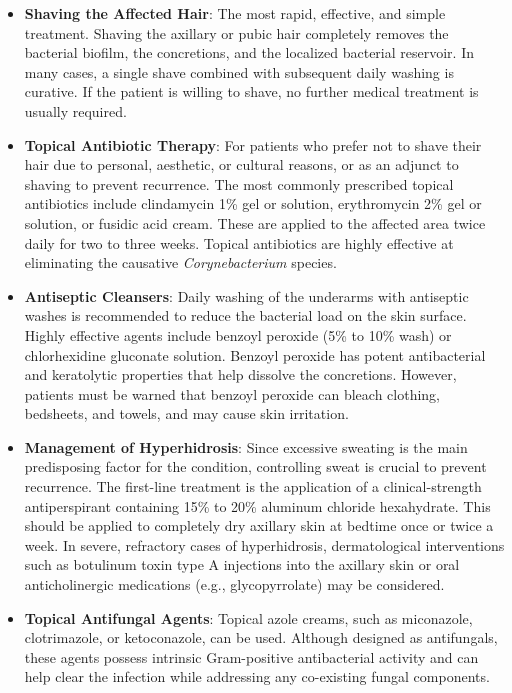 \begin{itemize}
    \item \textbf{Shaving the Affected Hair}: The most rapid, effective, and simple treatment. Shaving the axillary or pubic hair completely removes the bacterial biofilm, the concretions, and the localized bacterial reservoir. In many cases, a single shave combined with subsequent daily washing is curative. If the patient is willing to shave, no further medical treatment is usually required.
    \item \textbf{Topical Antibiotic Therapy}: For patients who prefer not to shave their hair due to personal, aesthetic, or cultural reasons, or as an adjunct to shaving to prevent recurrence. The most commonly prescribed topical antibiotics include clindamycin 1\% gel or solution, erythromycin 2\% gel or solution, or fusidic acid cream. These are applied to the affected area twice daily for two to three weeks. Topical antibiotics are highly effective at eliminating the causative \textit{Corynebacterium} species.
    \item \textbf{Antiseptic Cleansers}: Daily washing of the underarms with antiseptic washes is recommended to reduce the bacterial load on the skin surface. Highly effective agents include benzoyl peroxide (5\% to 10\% wash) or chlorhexidine gluconate solution. Benzoyl peroxide has potent antibacterial and keratolytic properties that help dissolve the concretions. However, patients must be warned that benzoyl peroxide can bleach clothing, bedsheets, and towels, and may cause skin irritation.
    \item \textbf{Management of Hyperhidrosis}: Since excessive sweating is the main predisposing factor for the condition, controlling sweat is crucial to prevent recurrence. The first-line treatment is the application of a clinical-strength antiperspirant containing 15\% to 20\% aluminum chloride hexahydrate. This should be applied to completely dry axillary skin at bedtime once or twice a week. In severe, refractory cases of hyperhidrosis, dermatological interventions such as botulinum toxin type A injections into the axillary skin or oral anticholinergic medications (e.g., glycopyrrolate) may be considered.
    \item \textbf{Topical Antifungal Agents}: Topical azole creams, such as miconazole, clotrimazole, or ketoconazole, can be used. Although designed as antifungals, these agents possess intrinsic Gram-positive antibacterial activity and can help clear the infection while addressing any co-existing fungal components.
\end{itemize}


